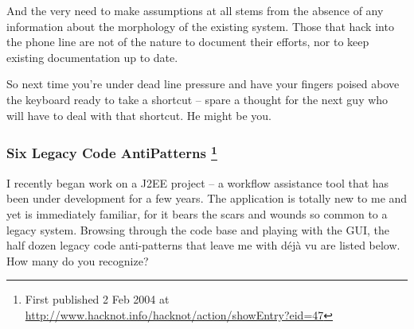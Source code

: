 \documentclass{article}
\begin{document}
And the very need to make assumptions at all stems from the absence of
any information about the morphology of the existing system. Those that
hack into the phone line are not of the nature to document their
efforts, nor to keep existing documentation up to date.

So next time you're under dead line pressure and have your fingers
poised above the keyboard ready to take a shortcut -- spare a thought
for the next guy who will have to deal with that shortcut. He might be
you.

\subsubsection{Six Legacy Code AntiPatterns \footnote{First published 2 Feb 2004 at
\url{http://www.hacknot.info/hacknot/action/showEntry?eid=47}}}
\label{sec:orgheadline344}

I recently began work on a J2EE project -- a workflow assistance tool
that has been under development for a few years. The application is
totally new to me and yet is immediately familiar, for it bears the
scars and wounds so common to a legacy system. Browsing through the code
base and playing with the GUI, the half dozen legacy code anti-patterns
that leave me with déjà vu are listed below. How many do you recognize?
\end{document}
